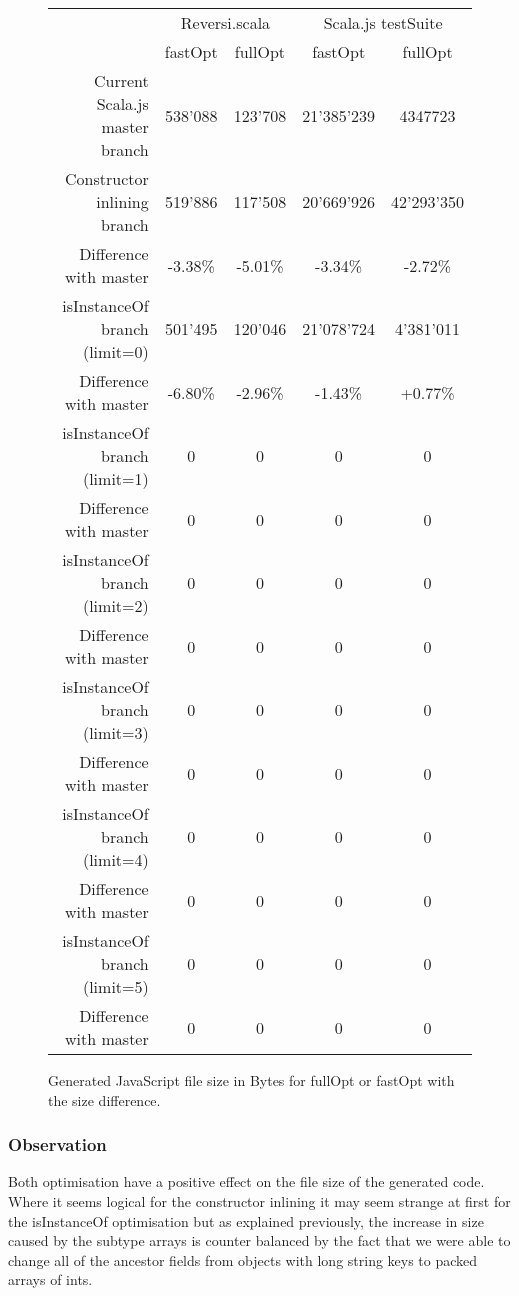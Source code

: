 \begin{figure}[H]
  \centering
  \begin{tabular}{ | r | c | c | c | c | }\hline
    & \multicolumn{2}{|c|}{Reversi.scala} & \multicolumn{2}{|c|}{Scala.js
testSuite}\\
    & fastOpt & fullOpt & fastOpt & fullOpt\\ \hline
    Current Scala.js master branch & 538'088 & 123'708 & 21'385'239 &
4347723\\
\hline \hline
    Constructor inlining branch & 519'886 & 117'508 & 20'669'926 & 42'293'350\\
\hline
    Difference with master & -3.38\% & -5.01\% & -3.34\% & -2.72\%\\ \hline
\hline	
    isInstanceOf branch (limit=0)& 501'495 & 120'046 & 21'078'724 & 4'381'011\\
\hline
    Difference with master & -6.80\% & -2.96\% & -1.43\% & +0.77\%\\ \hline
\hline
    isInstanceOf branch (limit=1)& 0 & 0 & 0 & 0\\ \hline
    Difference with master & 0 & 0 & 0 & 0\\ \hline
\hline
    isInstanceOf branch (limit=2)& 0 & 0 & 0 & 0\\ \hline
    Difference with master & 0 & 0 & 0 & 0\\ \hline
\hline
    isInstanceOf branch (limit=3)& 0 & 0 & 0 & 0\\ \hline
    Difference with master & 0 & 0 & 0 & 0\\ \hline
\hline
    isInstanceOf branch (limit=4)& 0 & 0 & 0 & 0\\ \hline
    Difference with master & 0 & 0 & 0 & 0\\ \hline
\hline
    isInstanceOf branch (limit=5)& 0 & 0 & 0 & 0\\ \hline
    Difference with master & 0 & 0 & 0 & 0\\ \hline
    
  \end{tabular}
  \captionsetup{justification=centering}
  \caption{Generated JavaScript file size in Bytes for fullOpt or fastOpt with
the size difference.}
  \label{fig:file_size}
\end{figure}

\subsubsection{Observation}
Both optimisation have a positive effect on the file size of the generated
code. Where it seems logical for the constructor inlining it may seem
strange at first for the isInstanceOf optimisation but as explained previously,
the increase in size caused by the subtype arrays is counter balanced by the
fact that we were able to change all of the ancestor fields from objects with
long string keys to packed arrays of ints.

